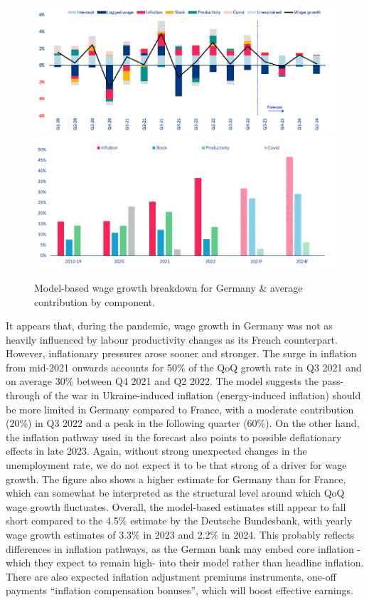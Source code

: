 \begin{figure}[H]
    \centering
    \caption{Model-based wage growth breakdown for Germany \& average contribution by component.}
    \includegraphics[width=.8\textwidth]{Core/2.Labour/img/germanyb1.png}
    \includegraphics[width=.8\textwidth]{Core/2.Labour/img/germanyb2.png}
    \label{figure:gerbreakdown}
\end{figure}

It appears that, during the pandemic, wage growth in Germany was not as heavily influenced by labour productivity changes as its French counterpart. 
However, inflationary pressures arose sooner and stronger. 
The surge in inflation from mid-2021 onwards accounts for 50\% of the QoQ growth rate in Q3 2021 and on average 30\% between Q4 2021 and Q2 2022. 
The model suggests the pass-through of the war in Ukraine-induced inflation (energy-induced inflation) should be more limited in Germany compared to France, with a moderate contribution (20\%) in Q3 2022 and a peak in the following quarter (60\%). 
On the other hand, the inflation pathway used in the forecast also points to possible deflationary effects in late 2023. 
Again, without strong unexpected changes in the unemployment rate, we do not expect it to be that strong of a driver for wage growth. 
The figure also shows a higher estimate for Germany than for France, which can somewhat be interpreted as the structural level around which QoQ wage growth fluctuates. 
Overall, the model-based estimates still appear to fall short compared to the 4.5\% estimate by the Deutsche Bundesbank, with yearly wage growth estimates of 3.3\% in 2023 and 2.2\% in 2024. 
This probably reflects differences in inflation pathways, as the German bank may embed core inflation -which they expect to remain high- into their model rather than headline inflation. 
There are also expected inflation adjustment premiums instruments, one-off payments “inflation compensation bonuses”, which will boost effective earnings. 

